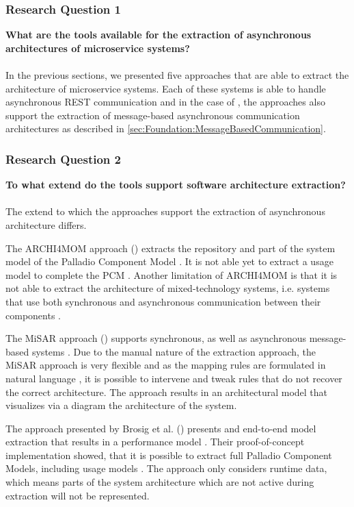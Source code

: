 \subsubsection{Research Question 1}
\textbf{What are the tools available for the extraction of asynchronous architectures of microservice systems?}
\\ \\
In the previous sections, we presented five approaches that are able to extract the architecture of microservice systems.
Each of these systems is able to handle asynchronous REST communication and in the case of \cite{Singh2022ARCHI4MOM,Alshuqayran2018MiSAR,Brosig2011}, the approaches also support the extraction of message-based asynchronous communication architectures as described in \autoref{sec:Foundation:MessageBasedCommunication}.

\subsubsection{Research Question 2}
\textbf{To what extend do the tools support software architecture extraction?}
\\ \\
The extend to which the approaches support the extraction of asynchronous architecture differs.

The ARCHI4MOM approach (\cite{Singh2022ARCHI4MOM}) extracts the repository and part of the system model of the Palladio Component Model \cite{Singh2022ARCHI4MOM}.
It is not able yet to extract a usage model to complete the PCM \cite{Singh2022ARCHI4MOM}.
Another limitation of ARCHI4MOM is that it is not able to extract the architecture of mixed-technology systems, i.e. systems that use both synchronous and asynchronous communication between their components \cite{Singh2022ARCHI4MOM}.

The MiSAR approach (\cite{Alshuqayran2018MiSAR}) supports synchronous, as well as asynchronous message-based systems \cite{Alshuqayran2020Thesis}.
Due to the manual nature of the extraction approach, the MiSAR approach is very flexible and as the mapping rules are formulated in natural language \cite{Alshuqayran2020Thesis}, it is possible to intervene and tweak rules that do not recover the correct architecture.
The approach results in an architectural model that visualizes via a diagram the architecture of the system.

The approach presented by Brosig et al. (\cite{Brosig2011}) presents and end-to-end model extraction that results in a performance model \cite{Brosig2011}.
Their proof-of-concept implementation showed, that it is possible to extract full Palladio Component Models, including usage models \cite{Brosig2011}.
The approach only considers runtime data, which means parts of the system architecture which are not active during extraction will not be represented.

